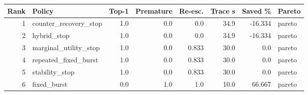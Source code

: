 \begin{tabular}{rlrrrrrl}
\hline
Rank & Policy & Top-1 & Premature & Re-esc. & Trace s & Saved \% & Pareto \\
\hline
1 & counter_recovery_stop & 1.0 & 0.0 & 0.0 & 34.9 & -16.334 & pareto \\
2 & hybrid_stop & 1.0 & 0.0 & 0.0 & 34.9 & -16.334 & pareto \\
3 & marginal_utility_stop & 1.0 & 0.0 & 0.833 & 30.0 & 0.0 & pareto \\
4 & repeated_fixed_burst & 1.0 & 0.0 & 0.833 & 30.0 & 0.0 & pareto \\
5 & stability_stop & 1.0 & 0.0 & 0.833 & 30.0 & 0.0 & pareto \\
6 & fixed_burst & 0.0 & 1.0 & 1.0 & 10.0 & 66.667 & pareto \\
\hline
\end{tabular}
